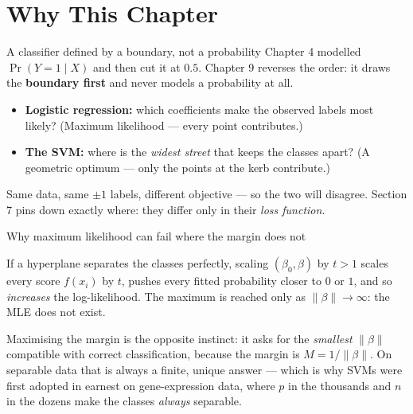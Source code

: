 \documentclass[aspectratio=169,11pt]{beamer}
\begin{document}
\section{Why This Chapter}

\begin{frame}{A classifier defined by a boundary, not a probability}
  Chapter 4 modelled $\Pr(Y=1\mid X)$ and then cut it at $0.5$. Chapter 9
  reverses the order: it draws the \textbf{boundary first} and never models a
  probability at all.
  \begin{readme}
    \begin{itemize}
      \item \textbf{Logistic regression:} which coefficients make the observed
            labels most likely? (Maximum likelihood --- every point
            contributes.)
      \item \textbf{The SVM:} where is the \emph{widest street} that keeps the
            classes apart? (A geometric optimum --- only the points at the kerb
            contribute.)
    \end{itemize}
  \end{readme}
  \begin{takeaway}
    Same data, same $\pm1$ labels, different objective --- so the two will
    disagree. Section 7 pins down exactly where: they differ only in their
    \emph{loss function}.
  \end{takeaway}
\end{frame}

\begin{frame}{Why maximum likelihood can fail where the margin does not}
  \footnotesize
  \begin{numexample}
    If a hyperplane separates the classes perfectly, scaling $(\beta_0,\beta)$
    by $t>1$ scales every score $f(x_i)$ by $t$, pushes every fitted
    probability closer to $0$ or $1$, and so \emph{increases} the
    log-likelihood. The maximum is reached only as $\|\beta\|\to\infty$: the
    MLE does not exist.
  \end{numexample}
  \begin{takeaway}
    Maximising the margin is the opposite instinct: it asks for the
    \emph{smallest} $\|\beta\|$ compatible with correct classification, because
    the margin is $M=1/\|\beta\|$. On separable data that is always a finite,
    unique answer --- which is why SVMs were first adopted in earnest on
    gene-expression data, where $p$ in the thousands and $n$ in the dozens make
    the classes \emph{always} separable.
  \end{takeaway}
\end{frame}
\end{document}
